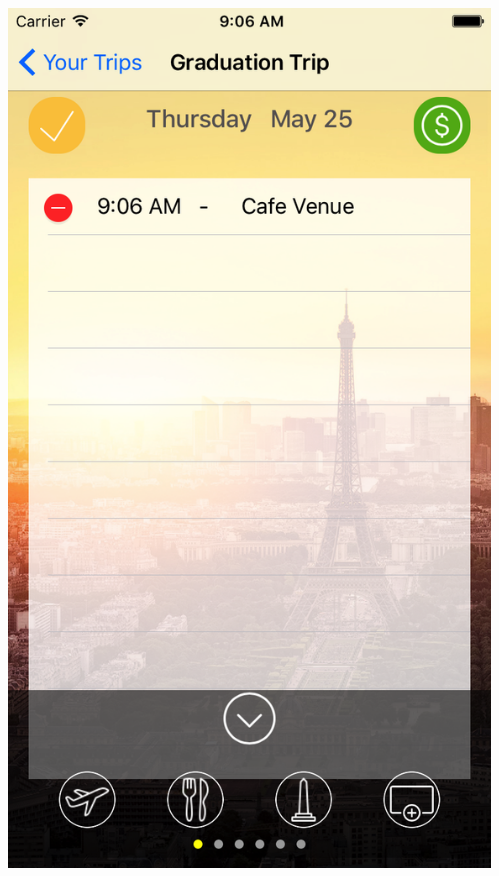 \documentclass{beamer}
\begin{document}
\begin{frame}
\begin{columns}
\begin{column}{0.3\textwidth}
\begin{center}
        \end{center}
    \end{column}
    \begin{column}{0.3\textwidth}  %
        \begin{center}
            \includegraphics[scale=0.14]{itinerary2}
        \end{center}
    \end{column}
\end{columns}
\end{frame}
\end{document}
